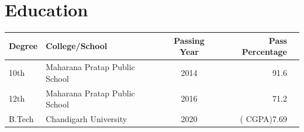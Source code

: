 \documentclass[11pt]{article}
\begin{document}
\section{Education}
\begin{flushright}

\begin{tabular}{||l|l|c|r|r||}
\hline
Degree & College/School  & Passing Year & Pass Percentage \\
\hline 
10th & Maharana Pratap Public School & 2014 & 91.6\\
12th & Maharana Pratap Public School & 2016 & 71.2\\
B.Tech & Chandigarh University & 2020 & ( CGPA)7.69\\
\hline
\end{tabular}
 \end{flushright} 
 
 
\end{document}
